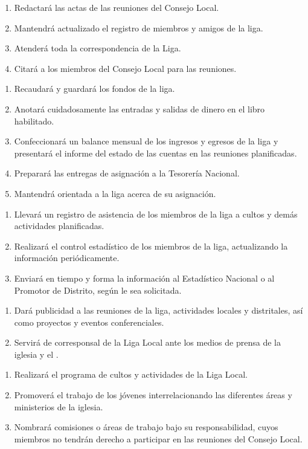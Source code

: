\begin{enumerate}
    \item Redactará las actas de las reuniones del Consejo Local.
    \item Mantendrá actualizado el registro de miembros y amigos de la liga.
    \item Atenderá toda la correspondencia de la Liga.
    \item Citará a los miembros del Consejo Local para las reuniones.
\end{enumerate}

\begin{enumerate}
    \item Recaudará y guardará los fondos de la liga.
    \item Anotará cuidadosamente las entradas y salidas de dinero en el libro habilitado.
    \item Confeccionará un balance mensual de los ingresos y egresos de la liga y presentará el informe del estado de las cuentas en las reuniones planificadas.
    \item Preparará las entregas de asignación a la Tesorería Nacional.
    \item Mantendrá orientada a la liga acerca de su asignación.
\end{enumerate}

\begin{enumerate}
    \item Llevará un registro de asistencia de los miembros de la liga a cultos y demás actividades planificadas.
    \item Realizará el control estadístico de los miembros de la liga, actualizando la información periódicamente.
    \item Enviará en tiempo y forma la información al Estadístico Nacional o al Promotor de Distrito, según le sea solicitada.
\end{enumerate}

\begin{enumerate}
    \item Dará publicidad a las reuniones de la liga, actividades locales y distritales, así como proyectos y eventos conferenciales.
    \item Servirá de corresponsal de la Liga Local ante los medios de prensa de la iglesia y el \OOLMJ{}.
\end{enumerate}

\begin{enumerate}
    \item Realizará el programa de cultos y actividades de la Liga Local.
    \item Promoverá el trabajo de los jóvenes interrelacionando las diferentes áreas y ministerios de la iglesia.
    \item Nombrará comisiones o áreas de trabajo bajo su responsabilidad, cuyos miembros no tendrán derecho a participar en las reuniones del Consejo Local.
\end{enumerate}

